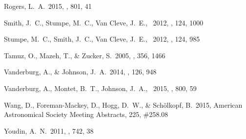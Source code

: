 \documentclass[12pt,preprint]{aastex}
\begin{document}
\begin{thebibliography}{}
Rogers, L.~A.\ 2015, \apj, 801, 41

Smith, J.~C., Stumpe, M.~C., Van Cleve, J.~E., \etal\ 2012, \pasp, 124, 1000

Stumpe, M.~C., Smith, J.~C., Van Cleve, J.~E., \etal\ 2012, \pasp, 124, 985

Tamuz, O., Mazeh, T., \& Zucker, S.\ 2005, \mnras, 356, 1466

Vanderburg, A., \& Johnson, J.~A.\ 2014, \pasp, 126, 948

Vanderburg, A., Montet, B.~T., Johnson, J.~A., \etal\ 2015, \apj, 800, 59

Wang, D., Foreman-Mackey, D., Hogg, D.~W., \& Sch{\"o}lkopf, B.\ 2015,
American Astronomical Society Meeting Abstracts, 225, \#258.08

Youdin, A.~N.\ 2011, \apj, 742, 38

\end{thebibliography}
\end{document}
